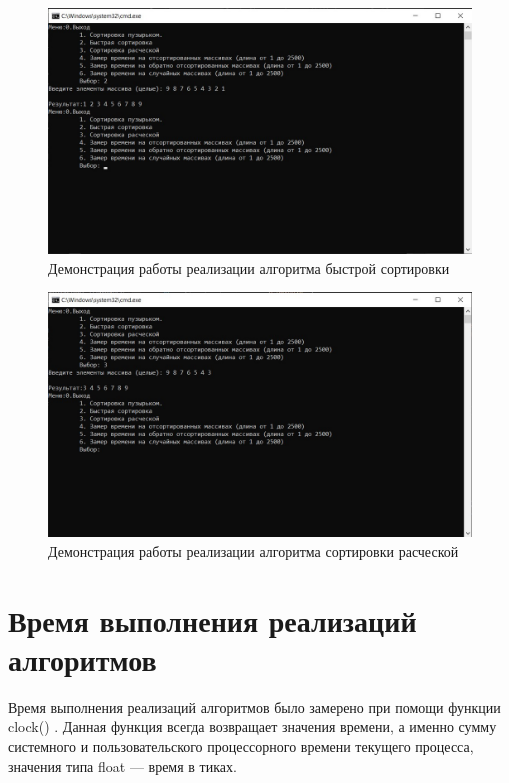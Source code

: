 \begin{figure}[H]
	\centering
	\includegraphics[width=1\linewidth]{inc/img/demoq}
	\caption{Демонстрация работы реализации алгоритма быстрой сортировки}
	\label{fig:demoq}
\end{figure}


\begin{figure}[H]
	\centering
	\includegraphics[width=1\linewidth]{"inc/img/Снимок экрана 2022-10-08 005524"}
	\caption{Демонстрация работы реализации алгоритма сортировки расческой}
	\label{fig:--2022-10-08-005524}
\end{figure}


\section{Время выполнения реализаций алгоритмов}

Время выполнения реализаций алгоритмов было замерено при помощи функции clock() \cite{cpplangtime}. Данная функция всегда возвращает значения времени, а именно сумму системного и пользовательского процессорного времени текущего процесса, значения типа float --- время в тиках.

